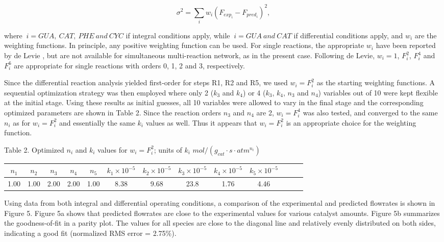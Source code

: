 \documentclass[journal=iecred,manuscript=article]{achemso}
\begin{document}
\begin{equation} \label{Eq19}
\sigma^2=\sum_{i}{w_i(F_{exp_i}-F_{pred_i})^2},
\end{equation}

where $~i=GUA,~CAT,~PHE~and~CYC$ if integral conditions apply,
while $~i=GUA~and~CAT$ if differential conditions apply,
and $w_i$ are the weighting functions.
In principle, any positive weighting function can be used.
For single reactions, the appropriate $w_i$ have been reported by de Levie \cite{Levie1986},
but are not available for simultaneous multi-reaction network, as in the present case.
Following de Levie, $w_i=1$, $F^2_i$, $F^4_i$ and $F^6_i$ are
appropriate for single reactions with orders 0, 1, 2 and 3, respectively. \cite{Levie1986}

Since the differential reaction analysis yielded first-order for steps R1, R2 and R5, 
we used $w_i=F^2_i$ as the starting weighting functions.
A sequential optimization strategy was then employed where only
2 ($k_3$ and $k_4$) or 4 ($k_3$, $k_4$, $n_3$ and $n_4$) variables out of 10 were kept flexible at the initial stage.
Using these results as initial guesses,
all 10 variables were allowed to vary in the final stage
and the corresponding optimized parameters are shown in Table 2. Since the reaction orders $n_3$ and $n_4$ are 2, 
$w_i=F^4_i$ was also tested, and converged to the same $n_i$
as for $w_i=F^2_i$ and essentially the same $k_i$ values as well.
Thus it appears that $w_i=F^2_i$ is an appropriate choice for the weighting function.

\begin{center}
Table 2. Optimized $n_i$ and $k_i$ values for $w_i=F^2_i$;
units of $k_i$ $mol/(g_{cat} \cdot s \cdot atm^{n_i})$ 
\begin{tabular}{c c c c c c c c c c c c c}
\toprule
 $n_1$ & $n_2$ & $n_3$ & $n_4$ & $n_5$ & $k_1\times 10^{-5}$ & $k_2\times 10^{-5}$ & $k_3\times 10^{-5}$ & $k_4\times 10^{-5}$ & $k_5\times 10^{-5}$\\
\midrule
 1.00 & 1.00 & 2.00 & 2.00 & 1.00 & 8.38 & 9.68 & 23.8  & 1.76 & 4.46\\
\bottomrule
\end{tabular}
\end{center}

Using data from both integral and differential operating conditions,
a comparison of the experimental and predicted flowrates is shown in Figure 5.
Figure 5a shows that predicted flowrates are close to the experimental values for various catalyst amounts.
Figure 5b summarizes the goodness-of-fit in a parity plot.
The values for all species are close to the diagonal line and relatively evenly distributed on both sides, indicating a good fit (normalized RMS error = 2.75\%).
\end{document}
